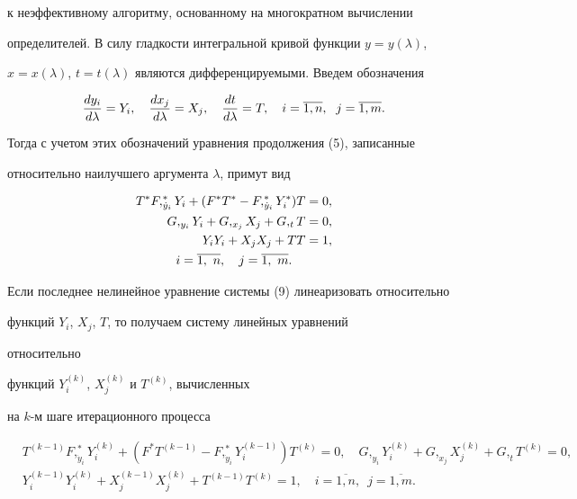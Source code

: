 к неэффективному алгоритму, основанному на многократном вычислении


определителей. В силу гладкости интегральной кривой функции $y=y(\lambda)$,


$x=x(\lambda)$, $t=t(\lambda)$ являются дифференцируемыми. Введем обозначения


\begin{equation}


\derhd{y_i}{\lambda}=Y_i,\quad \derhd{x_j}{\lambda}=X_j,\quad


\derhd{t}{\lambda}=T,\quad


i=\overline{1, n},\; \ j=\overline{1, m}.


\end{equation}


Тогда с учетом этих обозначений уравнения продолжения (5), записанные


относительно наилучшего аргумента $\lambda$, примут вид


\begin{gather}


\begin{split}


T^*F,_{\Dot y_i}^*Y_i +(F^*T^*-F,_{\Dot y_i}^*Y_i^*)T & = 0,\\


G,_{y_i}Y_i + G,_{x_j}X_j + G,_tT & = 0,\\


Y_iY_i + X_jX_j + TT & = 1,


\end{split}


\\


i=\overline{1,\ n},\quad j=\overline{1,\ m}.\notag


\end{gather}





Если последнее нелинейное уравнение системы (9) линеаризовать относительно


функций $Y_i$, $X_j$, $T$, то  получаем систему линейных уравнений


относительно


функций $Y_i^{(k)}$, $X_j^{(k)}$ и $T^{(k)}$, вычисленных


на $k$-м шаге итерационного процесса


\begin{equation}


\begin{split}


&T^{(k-1)}F,_{\Dot y_i}^*Y_i^{(k)}+(F^*T^{(k-1)}-F,_{\Dot y_i}^*Y_i^{(k-1)}


)T^{(k)}=0,\quad


G,_{y_i}Y_i^{(k)}+G,_{x_j}X_j^{(k)}+G,_tT^{(k)}=0,\\


&Y_i^{(k-1)}Y_i^{(k)}+X_j^{(k-1)}X_j^{(k)}+T^{(k-1)}T^{(k)}=1,\quad


i=\overline{1, n},\; \ j=\overline{1,m}.


\end{split}


\end{equation}


